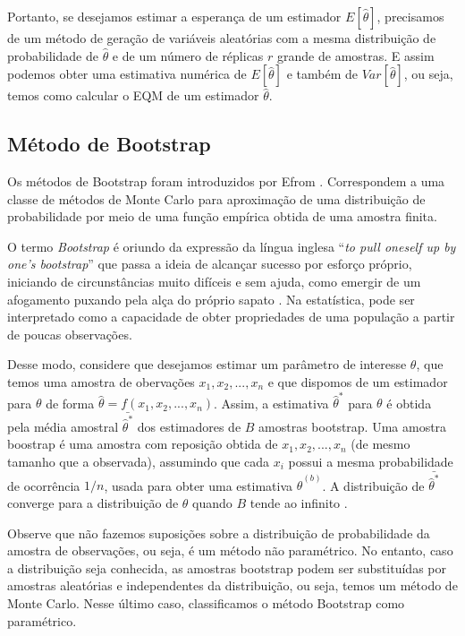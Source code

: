 \documentclass[12pt]{article}
\theoremstyle{definition}
\begin{document}
Portanto, se desejamos estimar a esperança de um estimador $E[\hat \theta]$, precisamos de um método de geração de variáveis aleatórias com a mesma distribuição de probabilidade de $\hat \theta$ e de um número de réplicas $r$ grande de amostras. E assim podemos obter uma estimativa numérica de $E[\hat \theta]$ e também de $Var[\hat \theta]$, ou seja, temos como calcular o EQM de um estimador $\hat \theta$.


\subsection{Método de Bootstrap}

Os métodos de Bootstrap foram introduzidos por Efrom \cite{efron1979}. Correspondem a uma classe de métodos de Monte Carlo para aproximação de uma distribuição de probabilidade por meio de uma função empírica obtida de uma amostra finita.

O termo \textit{Bootstrap} é oriundo da expressão da língua inglesa “\textit{to pull oneself up by one’s bootstrap}” que passa a ideia de alcançar sucesso por esforço próprio, iniciando de circunstâncias muito difíceis e sem ajuda, como emergir de um afogamento puxando pela alça do próprio sapato \cite{collins2023}. Na estatística, pode ser interpretado como a capacidade de obter propriedades de uma população a partir de poucas observações.

Desse modo, considere que desejamos estimar um parâmetro de interesse $\theta$, que temos uma amostra de obervações $x_1, x_2, ..., x_n$ e que dispomos de um estimador para $\theta$ de forma $\hat \theta = f(x_1, x_2, ..., x_n)$. Assim, a estimativa ${\hat \theta}^*$ para $\theta$ é obtida pela média amostral $\bar{{\hat \theta}^*}$ dos estimadores de $B$ amostras bootstrap. Uma amostra boostrap é uma amostra com reposição obtida de $x_1, x_2, ..., x_n$ (de mesmo tamanho que a observada), assumindo que cada $x_i$ possui a mesma probabilidade de ocorrência $1/n$, usada para obter uma estimativa ${\hat \theta}^{(b)}$. A distribuição de $\bar{{\hat \theta}^*}$ converge para a distribuição de $\theta$ quando $B$ tende ao infinito \cite{efron1993}.

Observe que não fazemos suposições sobre a distribuição de probabilidade da amostra de observações, ou seja, é um método não paramétrico. No entanto, caso a distribuição seja conhecida, as amostras bootstrap podem ser substituídas por amostras aleatórias e independentes da distribuição, ou seja, temos um método de Monte Carlo. Nesse último caso, classificamos o método Bootstrap como paramétrico.
\end{document}
